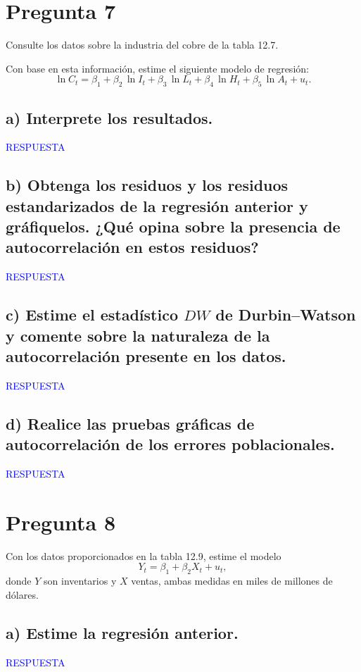 \documentclass[10pt]{article}
\begin{document}
\section{Pregunta 7}
Consulte los datos sobre la industria del cobre de la tabla 12.7.

Con base en esta información, estime el siguiente modelo de regresión:
\begin{equation*}
\ln C_t 
= \beta_1 
+ \beta_2\,\ln I_t 
+ \beta_3\,\ln L_t 
+ \beta_4\,\ln H_t 
+ \beta_5\,\ln A_t 
+ u_t.
\end{equation*}

\subsection{a) Interprete los resultados.}
\textcolor{blue}{RESPUESTA}

\subsection{b) Obtenga los residuos y los residuos estandarizados de la regresión anterior y gráfiquelos. ¿Qué opina sobre la presencia de autocorrelación en estos residuos?}
\textcolor{blue}{RESPUESTA}

\subsection{c) Estime el estadístico \texorpdfstring{$DW$}{DW} de Durbin--Watson y comente sobre la naturaleza de la autocorrelación presente en los datos.}
\textcolor{blue}{RESPUESTA}

\subsection{d) Realice las pruebas gráficas de autocorrelación de los errores poblacionales.}
\textcolor{blue}{RESPUESTA}
\section{Pregunta 8}
Con los datos proporcionados en la tabla 12.9, estime el modelo
\begin{equation*}
Y_t = \beta_1 + \beta_2 X_t + u_t,
\end{equation*}
\noindent donde $Y$ son inventarios y $X$ ventas, ambas medidas en miles de millones de dólares.

\subsection{a) Estime la regresión anterior.}
\textcolor{blue}{RESPUESTA}
\end{document}
